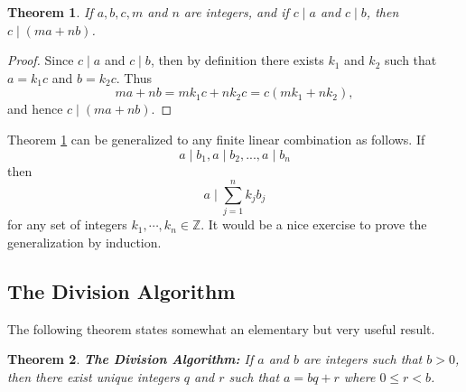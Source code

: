 \documentclass[12pt,letterpaper]{book}
\newtheorem{theorem}{Theorem}
\begin{document}
\begin{theorem}\label{thm4}
If $a,b,c,m$ and $n$ are integers, and if $c\mid a$ and $c\mid b$,
then\\ $c\mid (ma+nb)$.
\end{theorem}

\begin{proof}
Since $c\mid a$ and $c\mid b$, then by definition there exists $k_1$
and $k_2$ such that $a=k_1c$ and $b=k_2c$. Thus
\begin{equation*}
ma+nb=mk_1c+nk_2c=c(mk_1+nk_2),
\end{equation*}
and hence $c\mid (ma+nb)$.
\end{proof}

Theorem \ref{thm4} can be generalized to any finite linear combination as follows. If\\
\begin{equation*}
a\mid b_1, a\mid b_2,...,a\mid b_n
\end{equation*}
then
\begin{equation}
a\mid \sum_{j=1}^nk_jb_j
\end{equation}
for any set of integers $k_1,\cdots,k_n\in\mathbb{Z}$. It would be a
nice exercise to prove the generalization by induction.

\subsection{The Division Algorithm}

\par The following theorem states somewhat an elementary but very useful
result.

\begin{theorem}\label{thm5}\textbf{The Division Algorithm:}  If $a$ and $b$ are
integers such that $b>0$, then there exist unique integers $q$ and
$r$ such that $a=bq+r$ where $0\leq r< b$.
\end{theorem}
\end{document}
